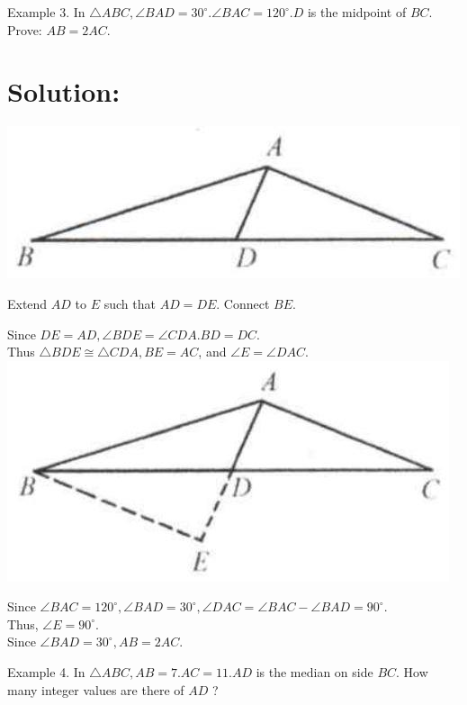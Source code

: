 \documentclass[10pt]{article}
\begin{document}
Example 3. In \(\triangle A B C, \angle B A D=30^{\circ} . \angle B A C=120^{\circ} . D\) is the midpoint of \(B C\). Prove: \(A B=2 A C\).

\section*{Solution:}
\begin{center}
\includegraphics[max width=\textwidth]{2025_04_17_97bc1f7e44d93c271a88g-024(4)}
\end{center}

Extend \(A D\) to \(E\) such that \(A D=D E\). Connect \(B E\).

Since \(D E=A D, \angle B D E=\angle C D A . B D=D C\).\\
Thus \(\triangle B D E \cong \triangle C D A, B E=A C\), and \(\angle E=\angle D A C\).\\
\includegraphics[max width=\textwidth, center]{2025_04_17_97bc1f7e44d93c271a88g-024}

Since \(\angle B A C=120^{\circ}, \angle B A D=30^{\circ}, \angle D A C=\angle B A C-\angle B A D=90^{\circ}\).\\
Thus, \(\angle E=90^{\circ}\).\\
Since \(\angle B A D=30^{\circ}, A B=2 A C\).

Example 4. In \(\triangle A B C, A B=7 . A C=11 . A D\) is the median on side \(B C\). How many integer values are there of \(A D\) ?
\end{document}
